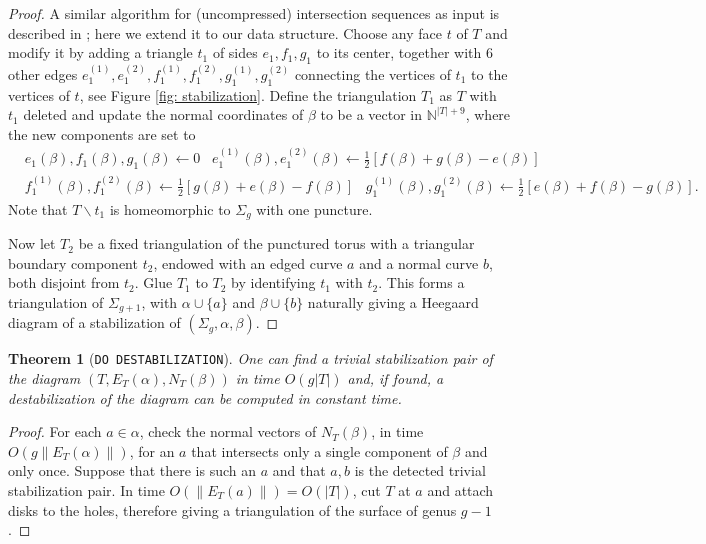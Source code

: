 \documentclass[11pt]{amsart}
\numberwithin{equation}{section}
\theoremstyle{plain}
\newtheorem{theorem}[equation]{Theorem}
\theoremstyle{definition}
\begin{document}
\begin{proof}
    A similar algorithm for (uncompressed) intersection sequences as input is described in \cite{ennes2025hardnesscomputationquantuminvariants}; here we extend it to our data structure.
    Choose any face $t$ of $T$ and modify it by adding a triangle $t_1$ of sides $e_1,f_1,g_1$ to its center, together with 6 other edges $e^{(1)}_1,e^{(2)}_1,f^{(1)}_1,f^{(2)}_1,g^{(1)}_1,g^{(2)}_1$ connecting the vertices of $t_1$ to the vertices of $t$, see Figure \ref{fig: stabilization}.
    Define the triangulation $T_1$ as $T$ with $t_1$ deleted and update the normal coordinates of $\beta$ to be a vector in $\mathbb{N}^{|T|+9}$, where the new components are set to
\begin{equation*}
\begin{split}
    &e_1(\beta), f_1(\beta), g_1(\beta) \xleftarrow{} 0 \;\;\;e^{(1)}_1(\beta),e^{(2)}_1(\beta)\xleftarrow{}\frac{1}{2}[f(\beta)+g(\beta)-e(\beta)]\\ &f^{(1)}_1(\beta),f^{(2)}_1(\beta)\xleftarrow{}\frac{1}{2}[g(\beta)+e(\beta)-f(\beta)]\;\;\;g^{(1)}_1(\beta),g^{(2)}_1(\beta)\xleftarrow{}\frac{1}{2}[e(\beta)+f(\beta)-g(\beta)].
\end{split}
\end{equation*}
Note that $T\backslash t_1$ is homeomorphic to $\Sigma_g$ with one puncture. 

Now let $T_2$  be a fixed triangulation of the punctured torus with a triangular boundary component $t_2$, endowed with an edged curve $a$ and a normal curve $b$, both disjoint from $t_2$. 
Glue $T_1$ to $T_2$ by identifying $t_1$ with $t_2$. 
This forms a triangulation of $\Sigma_{g+1}$, with $\alpha\cup \{a\}$ and $\beta\cup \{b\}$ naturally giving a Heegaard diagram of a stabilization of $(\Sigma_g,\alpha,\beta)$.
\end{proof}

\begin{theorem}[\texttt{DO DESTABILIZATION}]\label{th: do destabilization}
    One can find a trivial stabilization pair of the diagram $(T,E_T(\alpha),N_T(\beta))$ in time $O(g|T|)$ and, if found, a destabilization of the diagram can be computed in constant time.
\end{theorem}
\begin{proof}
    For each $a\in \alpha$, check the normal vectors of $N_T(\beta)$, in time $O(g\|E_T(\alpha)\|)$, for an $a$ that intersects only a single component of $\beta$ and only once. 
    Suppose that there is such an $a$ and that $a,b$ is the detected trivial stabilization pair. 
    In time $O(\|E_T(a)\|)=O(|T|)$, cut $T$ at $a$ and attach disks to the holes, therefore giving a triangulation of the surface of genus $g-1$.
\end{proof}
\end{document}
